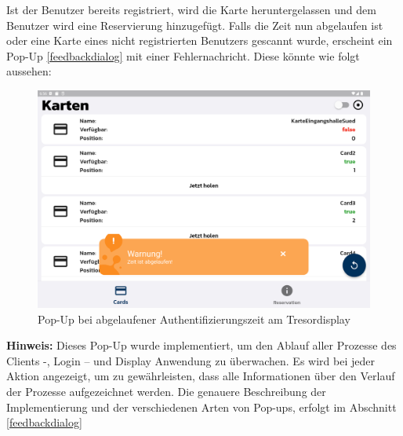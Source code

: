 {\newpage
Ist der Benutzer bereits registriert, wird die Karte heruntergelassen und dem Benutzer wird eine Reservierung hinzugefügt. Falls die Zeit nun abgelaufen ist oder eine Karte eines nicht registrierten Benutzers gescannt wurde, erscheint ein Pop-Up \ref{feedbackdialog} mit einer Fehlernachricht. Diese könnte wie folgt aussehen:  
\begin{figure}[!h]
\centering
\includegraphics[width=1.0\textwidth]{FLUTTER/images/GP/Display_Warning.png}
\caption{Pop-Up bei abgelaufener Authentifizierungszeit am Tresordisplay}
  \label{fig:display:popup}

\end{figure}

{\textbf{Hinweis:}} Dieses Pop-Up wurde implementiert, um den Ablauf aller Prozesse des Clients -, Login – und Display Anwendung zu überwachen. Es wird bei jeder Aktion angezeigt, um zu gewährleisten, dass alle Informationen über den Verlauf der Prozesse aufgezeichnet werden. Die genauere Beschreibung der Implementierung und der verschiedenen Arten von Pop-ups, erfolgt im Abschnitt \ref{feedbackdialog} 

\newpage
}
